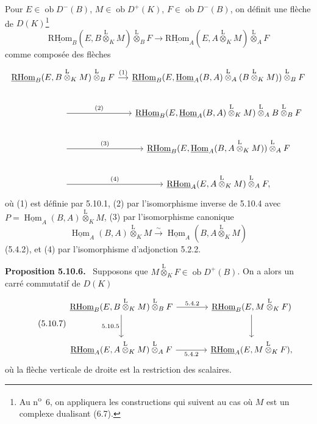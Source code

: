 \documentclass[11pt]{article}
\newenvironment{statement}[1]{\par\medskip\noindent\textbf{#1.}\ }{\par\medskip}
\DeclareMathOperator{\Hom}{Hom}
\newcommand{\ob}{\operatorname{ob}}
\providecommand{\RHom}{\mathrm{RHom}}
\providecommand{\uRHom}{\underline{\RHom}}
\providecommand{\uHom}{\underline{\Hom}}
\providecommand{\lten}{\overset{\mathrm L}{\otimes}}
\providecommand{\RHom}{\mathrm{RHom}}
\providecommand{\Hom}{\operatorname{Hom}}
\providecommand{\ob}{\operatorname{ob}}
\providecommand{\lten}{\overset{\mathrm L}{\otimes}}
\providecommand{\RHom}{\mathrm R\mathcal{H}om}
\providecommand{\lten}{\overset{\mathrm L}{\otimes}}
\providecommand{\lten}{\overset{\mathrm L}{\otimes}}
\providecommand{\lten}{\overset{\mathrm L}{\otimes}}
\providecommand{\lten}{\overset{\mathrm L}{\otimes}}
\providecommand{\RHom}{\mathrm{RHom}}
\providecommand{\Hom}{\operatorname{Hom}}
\providecommand{\lten}{\overset{\mathrm L}{\otimes}}
\begin{document}
Pour $E\in\ob D^-(B)$, $M\in\ob D^+(K)$, $F\in\ob D^-(B)$, on définit une flèche de $D(K)$\footnote{Au n\textsuperscript{o}~6, on appliquera les constructions qui suivent au cas où $M$ est un complexe dualisant (6.7).}
\begin{equation}\tag{5.10.5}
\uRHom_B(E,B\lten_KM)\lten_BF\longrightarrow\uRHom_A(E,A\lten_KM)\lten_AF
\end{equation}
comme composée des flèches
\[
\begin{tikzcd}[column sep=small]
\uRHom_B(E,B\lten_KM)\lten_BF \arrow[r,"(1)"] & \uRHom_B(E,\uHom_A(B,A)\lten_A(B\lten_KM))\lten_BF \\
\arrow[r,"(2)"] & \uRHom_B(E,\uHom_A(B,A)\lten_KM)\lten_A B\lten_BF \\
\arrow[r,"(3)"] & \uRHom_B(E,\uHom_A(B,A\lten_KM))\lten_AF \\
\arrow[r,"(4)"] & \uRHom_A(E,A\lten_KM)\lten_AF,
\end{tikzcd}
\]
où (1) est définie par 5.10.1, (2) par l'isomorphisme inverse de 5.10.4 avec $P=\uHom_A(B,A)\lten_KM$, (3) par l'isomorphisme canonique
\[
\uHom_A(B,A)\lten_KM\xrightarrow{\sim}\uHom_A(B,A\lten_KM)
\]
(5.4.2), et (4) par l'isomorphisme d'adjonction 5.2.2.

\begin{statement}{Proposition 5.10.6}
Supposons que $M\lten_KF\in\ob D^+(B)$. On a alors un carré commutatif de $D(K)$
\begin{equation}\tag{5.10.7}
\begin{tikzcd}[column sep=large,row sep=large]
\uRHom_B(E,B\lten_KM)\lten_BF \arrow[r,"5.4.2"] \arrow[d,"5.10.5"'] & \uRHom_B(E,M\lten_KF) \arrow[d]\\
\uRHom_A(E,A\lten_KM)\lten_AF \arrow[r,"5.4.2"'] & \uRHom_A(E,M\lten_KF),
\end{tikzcd}
\end{equation}
où la flèche verticale de droite est la restriction des scalaires.
\end{statement}
\end{document}
